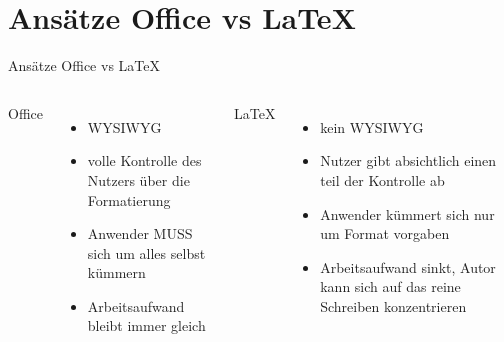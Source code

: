 \section{Ansätze Office  vs  \LaTeX}

\begin{frame}{Ansätze Office  vs  \LaTeX}
	\begin{columns}
	
		Office
		\begin{itemize}
			\item WYSIWYG
			\item volle Kontrolle des Nutzers über die Formatierung
			\item Anwender MUSS sich um alles selbst kümmern
			\item Arbeitsaufwand bleibt immer gleich
		\end{itemize}
		\LaTeX{}
		\begin{itemize}
				\item kein WYSIWYG
				\item Nutzer gibt absichtlich einen teil der Kontrolle ab
				\item Anwender kümmert sich nur um Format vorgaben
				\item Arbeitsaufwand sinkt, Autor kann sich auf das reine Schreiben konzentrieren
		\end{itemize}
	\end{columns}
\end{frame}